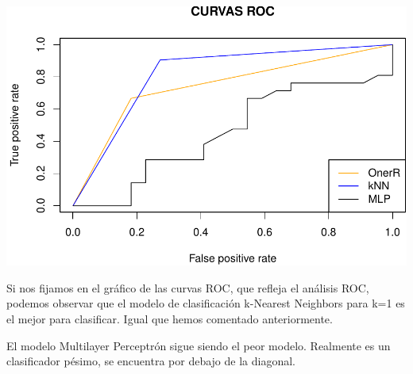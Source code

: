 \documentclass[]{article}
\begin{document}
\includegraphics{document_files/figure-latex/unnamed-chunk-12-1.pdf}

\newpage

Si nos fijamos en el gráfico de las curvas ROC, que refleja el análisis ROC, podemos observar que el modelo de clasificación k-Nearest Neighbors para k=1 es el mejor para clasificar. Igual que hemos comentado anteriormente. 

El modelo Multilayer Perceptrón sigue siendo el peor modelo. Realmente es un clasificador pésimo, se encuentra por debajo de la diagonal.
\end{document}
